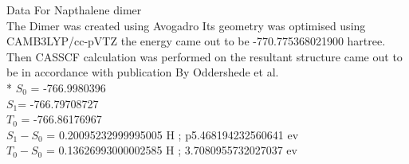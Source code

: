 \documentclass{article}
\begin{document}
Data For Napthalene dimer\\

The Dimer was created using Avogadro Its geometry was optimised using CAMB3LYP/cc-pVTZ the energy came out to be -770.775368021900 hartree. Then CASSCF calculation was performed on the resultant structure came out to be in accordance with publication By Oddershede et al. \cite{Oddershede_2004}\\*
\(S_{0}\) = -766.9980396 \\
\(S_{1}\)= -766.79708727 \\
\(T_{0}\) =  -766.86176967\\
\(S_{1} - S_{0}\) = 0.20095232999995005 H   ; p5.468194232560641 ev\\
\(T_{0} - S_{0} \) = 0.13626993000002585 H  ; 3.7080955732027037 ev\\
\begin{tabular}{c c c c}
\end{tabular}



\end{document}

